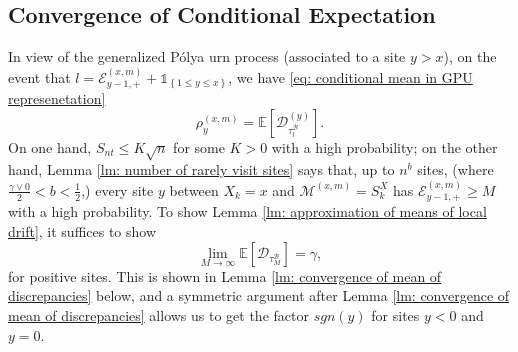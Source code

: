 \documentclass[EJP]{ejpecp} %
\begin{document}
\subsection{Convergence of Conditional Expectation}
\label{sec:RhoGamma}
In view of the generalized P\'{o}lya urn process (associated to a site $y> x$), 
on the event that $l = \mathcal{E}^{(x,m)}_{y-1,+} +\mathbb{1}_{\left\{1\leq y\leq x\right\}}$, we have \eqref{eq: conditional mean in GPU represenetation} 
$$\rho^{(x,m)}_y = \mathbb{E}\left[\mathcal{D}_{\tau_l^{\mathcal{B}}}^{(y)}\right].$$ 
On one hand, $S_{nt} \leq K\sqrt{n} $ for some $K>0$ with a high probability; on the other hand, Lemma \ref{lm: number of rarely visit sites} says that, up to $n^b$ sites, (where $\frac{\gamma \vee 0}{2}<b<\frac{1}{2}$,) every site $y$ between $X_k=x$ and $\mathcal{M}^{(x,m)} =S_{k}^X$ has $ \mathcal{E}^{(x,m)}_{y-1,+} \geq M $ with a high probability. To show Lemma \ref{lm: approximation of means of local drift}, it suffices to show 
\begin{equation}\label{eq: convergence of conditional expectation}
	\lim_{M\to\infty} \mathbb{E}[\mathcal{D}_{\tau_M^{\mathcal{B}}}] = \gamma , 
\end{equation} for positive sites. This is shown in Lemma \ref{lm: convergence of mean of discrepancies} below, and a symmetric argument after Lemma \ref{lm: convergence of mean of discrepancies} allows us to get the factor $sgn(y)$ for sites $y<0$ and $y=0$.
\end{document}
